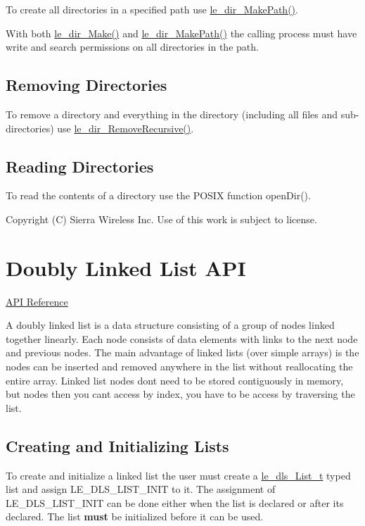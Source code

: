 To create all directories in a specified path use {\ttfamily \hyperlink{le__dir_8h_a41fc915e2a21ea91dabe335f1316df74}{le\+\_\+dir\+\_\+\+Make\+Path()}}.

With both \hyperlink{le__dir_8h_a7ac7d25b67f2e47127084677626d5344}{le\+\_\+dir\+\_\+\+Make()} and \hyperlink{le__dir_8h_a41fc915e2a21ea91dabe335f1316df74}{le\+\_\+dir\+\_\+\+Make\+Path()} the calling process must have write and search permissions on all directories in the path.\hypertarget{c_dir_c_dir_delete}{}\subsection{Removing Directories}\label{c_dir_c_dir_delete}
To remove a directory and everything in the directory (including all files and sub-\/directories) use {\ttfamily \hyperlink{le__dir_8h_a9eca51d0e3031f9dee7b875a62c8b1e0}{le\+\_\+dir\+\_\+\+Remove\+Recursive()}}.\hypertarget{c_dir_c_dir_read}{}\subsection{Reading Directories}\label{c_dir_c_dir_read}
To read the contents of a directory use the P\+O\+S\+I\+X function {\ttfamily open\+Dir()}.





Copyright (C) Sierra Wireless Inc. Use of this work is subject to license. \hypertarget{c_doublyLinkedList}{}\section{Doubly Linked List A\+P\+I}\label{c_doublyLinkedList}
\hyperlink{le__doubly_linked_list_8h}{A\+P\+I Reference}





A doubly linked list is a data structure consisting of a group of nodes linked together linearly. Each node consists of data elements with links to the next node and previous nodes. The main advantage of linked lists (over simple arrays) is the nodes can be inserted and removed anywhere in the list without reallocating the entire array. Linked list nodes don\textquotesingle{}t need to be stored contiguously in memory, but nodes then you can\textquotesingle{}t access by index, you have to be access by traversing the list.\hypertarget{c_doubly_linked_list_dls_createList}{}\subsection{Creating and Initializing Lists}\label{c_doubly_linked_list_dls_createList}
To create and initialize a linked list the user must create a \hyperlink{structle__dls___list__t}{le\+\_\+dls\+\_\+\+List\+\_\+t} typed list and assign L\+E\+\_\+\+D\+L\+S\+\_\+\+L\+I\+S\+T\+\_\+\+I\+N\+I\+T to it. The assignment of L\+E\+\_\+\+D\+L\+S\+\_\+\+L\+I\+S\+T\+\_\+\+I\+N\+I\+T can be done either when the list is declared or after its declared. The list {\bfseries must} be initialized before it can be used.


